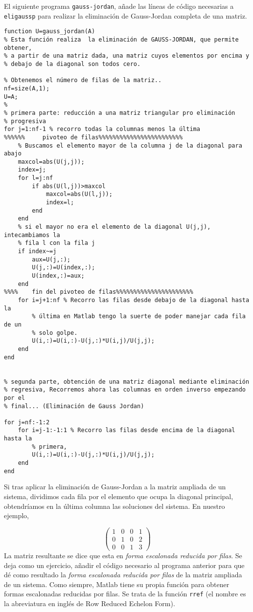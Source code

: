 El siguiente programa \texttt{gauss-jordan}, añade las líneas de código necesarias a \texttt{eligaussp} para realizar la eliminación de Gauss-Jordan completa de una matriz.

\begin{lstlisting}
function U=gauss_jordan(A)
% Esta función realiza  la eliminación de GAUSS-JORDAN, que permite obtener,
% a partir de una matriz dada, una matriz cuyos elementos por encima y 
% debajo de la diagonal son todos cero.

% Obtenemos el número de filas de la matriz..
nf=size(A,1);
U=A;
%
% primera parte: reducción a una matriz triangular pro eliminación
% progresiva
for j=1:nf-1 % recorro todas la columnas menos la última
%%%%%%     pivoteo de filas%%%%%%%%%%%%%%%%%%%%%%%%    
    % Buscamos el elemento mayor de la columna j de la diagonal para abajo
    maxcol=abs(U(j,j));
    index=j;
    for l=j:nf
        if abs(U(l,j))>maxcol
            maxcol=abs(U(l,j));
            index=l;
        end
    end
    % si el mayor no era el elemento de la diagonal U(j,j), intecambiamos la
    % fila l con la fila j
    if index~=j
        aux=U(j,:);
        U(j,:)=U(index,:);
        U(index,:)=aux;
    end
%%%%    fin del pivoteo de filas%%%%%%%%%%%%%%%%%%%%%%    
    for i=j+1:nf % Recorro las filas desde debajo de la diagonal hasta la 
        % última en Matlab tengo la suerte de poder manejar cada fila de un 
        % solo golpe.
        U(i,:)=U(i,:)-U(j,:)*U(i,j)/U(j,j);
    end
end


% segunda parte, obtención de una matriz diagonal mediante eliminación
% regresiva, Recorremos ahora las columnas en orden inverso empezando por el
% final... (Eliminación de Gauss Jordan)

for j=nf:-1:2
    for i=j-1:-1:1 % Recorro las filas desde encima de la diagonal hasta la
        % primera, 
        U(i,:)=U(i,:)-U(j,:)*U(i,j)/U(j,j);
    end
end
\end{lstlisting}

Si tras aplicar la eliminación de Gauss-Jordan a la matriz ampliada de un sistema, dividimos cada fila por el elemento que ocupa la diagonal principal, obtendríamos en la última columna las soluciones del sistema. En nuestro ejemplo,

\begin{equation*}
\begin{pmatrix}
1&     0&     0&    1\\
 0&    1&    0&    2\\
 0&     0&     1&    3
\end{pmatrix}
\end{equation*}
La matriz resultante se dice que esta en \emph{forma escalonada reducida por filas}. Se deja como un ejercicio, añadir el código necesario al programa anterior para que dé como resultado la \emph{forma escalonada reducida por filas} de la matriz ampliada de un sistema. Como siempre, Matlab tiene su propia función para obtener formas escalonadas reducidas por filas. Se trata de la función \texttt{rref} (el nombre es la abreviatura en inglés de Row Reduced Echelon Form).

